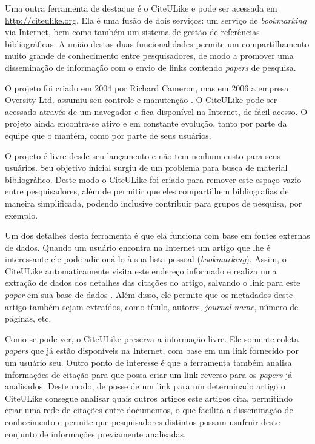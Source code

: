 \begin{textnew}

Uma outra ferramenta de destaque é o CiteULike \cite{citeulike} e pode ser acessada em \url{http://citeulike.org}. Ela é uma fusão de dois serviços: um serviço de \emph{bookmarking} via Internet, bem como também um sistema de gestão de referências bibliográficas. A união destas duas funcionalidades permite um compartilhamento muito grande de conhecimento entre pesquisadores, de modo a promover uma disseminação de informação com o envio de links contendo \emph{papers} de pesquisa. 

O projeto foi criado em 2004 por Richard Cameron, mas em 2006 a empresa Oversity Ltd. assumiu seu controle e manutenção \cite{CiteULike-FAQ}. O CiteULike pode ser acessado através de um navegador e fica disponível na Internet, de fácil acesso. O projeto ainda encontra-se ativo e em constante evolução, tanto por parte da equipe que o mantém, como por parte de seus usuários.

O projeto é livre desde seu lançamento e não tem nenhum custo para seus usuários. Seu objetivo inicial surgiu de um problema para busca de material bibliográfico. Deste modo o CiteULike foi criado para remover este espaço vazio entre pesquisadores, além de permitir que eles compartilhem bibliografias de maneira simplificada, podendo inclusive contribuir para grupos de pesquisa, por exemplo.

Um dos detalhes desta ferramenta é que ela funciona com base em fontes externas de dados. Quando um usuário encontra na Internet um artigo que lhe é interessante ele pode adicioná-lo à sua lista pessoal (\emph{bookmarking}). Assim, o CiteULike automaticamente visita este endereço informado e realiza uma extração de dados dos detalhes das citações do artigo, salvando o link para este \emph{paper} em sua base de dados \cite{citeulike}. Além disso, ele permite que os metadados deste artigo também sejam extraídos, como título, autores, \emph{journal name}, número de páginas, etc.

Como se pode ver, o CiteULike preserva a informação livre. Ele somente coleta \emph{papers} que já estão disponíveis na Internet, com base em um link fornecido por um usuário seu. Outro ponto de interesse é que a ferramenta também analisa informações de citação para que possa criar um link reverso para os \emph{papers} já analisados. Deste modo, de posse de um link para um determinado artigo o CiteULike consegue analisar quais outros artigos este artigos cita, permitindo criar uma rede de citações entre documentos, o que facilita a disseminação de conhecimento e permite que pesquisadores distintos possam usufruir deste conjunto de informações previamente analisadas.


\end{textnew}
